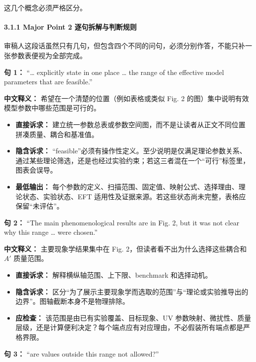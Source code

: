 \documentclass[
]{article}
\providecommand{\tightlist}{%
  \setlength{\itemsep}{0pt}\setlength{\parskip}{0pt}}
\begin{document}
这几个概念必须严格区分。

\paragraph{3.1.1 Major Point 2
逐句拆解与判断规则}\label{major-point-2-ux9010ux53e5ux62c6ux89e3ux4e0eux5224ux65adux89c4ux5219}

审稿人这段话虽然只有几句，但包含四个不同的问句，必须分别作答，不能只补一张参数表便视为全部完成。

\textbf{句 1：} ``\ldots{} explicitly state in one place \ldots{} the
range of the effective model parameters that are feasible.''

\textbf{中文释义：} 希望在一个清楚的位置（例如表格或类似 Fig. 2
的图）集中说明有效模型参数中哪些范围是可行的。

\begin{itemize}
\tightlist
\item
  \textbf{直接诉求：}
  建立统一参数总表或参数空间图，而不是让读者从正文不同位置拼凑质量、耦合和基准值。
\item
  \textbf{隐含诉求：}
  ``feasible''必须有操作性定义。至少说明是仅满足理论参数关系、通过某些理论筛选，还是也经过实验约束；若这三者混在一个``可行''标签里，图表会误导。
\item
  \textbf{最低输出：}
  每个参数的定义、扫描范围、固定值、映射公式、选择理由、理论状态、实验状态、EFT
  适用性及证据来源。若这些状态尚未完整，表格应保留``未评估''。
\end{itemize}

\textbf{句 2：} ``The main phenomenological results are in Fig. 2, but
it was not clear why this range \ldots{} were chosen.''

\textbf{中文释义：} 主要现象学结果集中在 Fig.
2，但读者看不出为什么选择这些耦合和 \(A'\) 质量范围。

\begin{itemize}
\tightlist
\item
  \textbf{直接诉求：} 解释横纵轴范围、上下限、benchmark 和选择动机。
\item
  \textbf{隐含诉求：}
  区分``为了展示主要现象学而选取的范围''与``理论或实验推导出的边界''。图轴截断本身不是物理排除。
\item
  \textbf{应检查：} 该范围是由已有实验覆盖、目标现象、UV
  参数映射、微扰性、质量层级，还是计算便利决定？每个端点应有对应理由，不必假装所有端点都是严格界限。
\end{itemize}

\textbf{句 3：} ``are values outside this range not allowed?''
\end{document}
